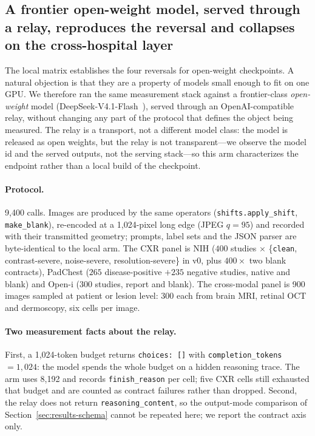 \subsection{A frontier open-weight model, served through a relay, reproduces the reversal and collapses on the cross-hospital layer}
\label{sec:results-frontier}

The local matrix establishes the four reversals for open-weight checkpoints. A
natural objection is that they are a property of models small enough to fit on one
GPU. We therefore ran the same measurement stack against a frontier-class
\emph{open-weight} model (DeepSeek-V4.1-Flash~\citep{deepseek2026v41flash}), served through an
OpenAI-compatible relay, without changing any part of the protocol that defines
the object being measured. The relay is a transport, not a different model class:
the model is released as open weights, but the relay is not transparent---we
observe the model id and the served outputs, not the serving stack---so this arm
characterizes the endpoint rather than a local build of the checkpoint.

{\sloppy
\paragraph{Protocol.} 9{,}400 calls. Images are produced by the same operators
(\texttt{shifts.apply\_shift}, \texttt{make\_blank}), re-encoded at a 1{,}024-pixel
long edge (JPEG $q{=}95$) and recorded with their transmitted geometry; prompts,
label sets and the JSON parser are byte-identical to the local arm. The CXR panel
is NIH ($400$ studies $\times$ \{\texttt{clean}, contrast-severe, noise-severe,
resolution-severe\} in v0, plus $400\times$ two blank contracts), PadChest
($265$ disease-positive $+235$ negative studies, native and blank) and Open-i
($300$ studies, report and blank). The cross-modal panel is 900 images sampled at
patient or lesion level: 300 each from brain MRI, retinal OCT and dermoscopy, six
cells per image.\par}

\paragraph{Two measurement facts about the relay.} First, a 1{,}024-token budget
returns \texttt{choices: []} with \texttt{completion\_tokens}${=}1{,}024$: the
model spends the whole budget on a hidden reasoning trace. The arm uses 8{,}192
and records \texttt{finish\_reason} per cell; five CXR cells still exhausted that
budget and are counted as contract failures rather than dropped. Second, the relay
does not return \texttt{reasoning\_content}, so the output-mode comparison of
Section~\ref{sec:results-schema} cannot be repeated here; we report the contract
axis only.

